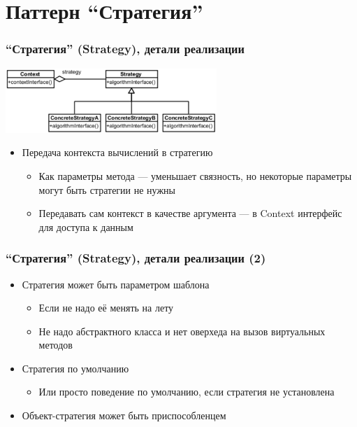 \documentclass[xetex,mathserif,serif]{beamer}
\begin{document}
	\section{Паттерн ``Стратегия''}

	\begin{frame}
		\frametitle{``Стратегия'' (Strategy), детали реализации}
		\begin{center}
			\includegraphics[width=0.6\textwidth]{strategy.png}
		\end{center}
		\begin{itemize}
			\item Передача контекста вычислений в стратегию
			\begin{itemize}
				\item Как параметры метода --- уменьшает связность, но некоторые параметры могут быть стратегии не нужны
				\item Передавать сам контекст в качестве аргумента --- в Context интерфейс для доступа к данным
			\end{itemize}
		\end{itemize}
	\end{frame}

	\begin{frame}
		\frametitle{``Стратегия'' (Strategy), детали реализации (2)}
		\begin{itemize}
			\item Стратегия может быть параметром шаблона
			\begin{itemize}
				\item Если не надо её менять на лету
				\item Не надо абстрактного класса и нет оверхеда на вызов виртуальных методов
			\end{itemize}
			\item Стратегия по умолчанию
			\begin{itemize}
				\item Или просто поведение по умолчанию, если стратегия не установлена
			\end{itemize}
			\item Объект-стратегия может быть приспособленцем
		\end{itemize}
	\end{frame}
\end{document}
